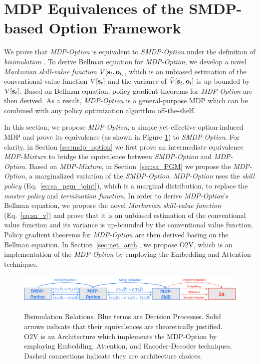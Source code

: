 \documentclass[10pt,journal,compsoc]{IEEEtran}
\newcommand{\red}[1]{\textcolor[HTML]{EB4335}{#1}}
\newcommand{\blue}[1]{\textcolor[HTML]{4285F4}{#1}}
\renewcommand{\cite}{\citep}
\begin{document}
\section{MDP Equivalences of the SMDP-based Option Framework}
\label{sec:smdp_mdp_sa}
We prove that \emph{MDP-Option} is equivalent to
\emph{SMDP-Option} under the definition of \emph{bisimulation}
\cite{givan2003equivalence}. To derive Bellman equation for
\emph{MDP-Option}, we develop a novel \emph{Markovian skill-value
  function} $\bar{V}[{\mathbf{s}}_t,{\mathbf{o}}_t]$, which is an unbiased
estimation of the conventional value function $V[{\mathbf{s}}_t]$ and the
variance of $\bar{V}[{\mathbf{s}}_t,{\mathbf{o}}_t]$ is up-bounded by
$V[{\mathbf{s}}_t]$. Based on Bellman equation, policy gradient theorems
for \emph{MDP-Option} are then derived. As a result,
\emph{MDP-Option} is a general-purpose MDP which can be combined
with any policy optimization algorithm off-the-shelf.


In this section, we propose \emph{MDP-Option}, a simple yet
effective option-induced MDP and prove its equivalence (as shown
in Figure \ref{fig:sa_logic}) to \emph{SMDP-Option}. For clarity,
in Section \ref{sec:mdp_option} we first prove an intermediate
equivalence \emph{MDP-Mixture} to bridge the equivalence between
\emph{SMDP-Option} and \emph{MDP-Option}. Based on
\emph{MDP-Mixture}, in Section~\ref{sec:sa_PGM} we propose the
\emph{MDP-Option}, a marginalized variation of the \emph{SMDP-Option}. \emph{MDP-Option}
uses the \emph{skill policy} (Eq.~\ref{eq:sa_pgm_joint}), which
is a marginal distribution, to replace the \emph{master policy}
and \emph{termination function}. In order to derive \emph{MDP-Option}'s
Bellman equation, we propose the novel \emph{Markovian
  skill-value function} (Eq.~\ref{eq:sa_v}) and prove that it is
an unbiased estimation of the conventional value function and its
variance is up-bounded by the conventional value function. Policy
gradient theorems for \emph{MDP-Option} are then derived basing on the
Bellman equation. In Section~\ref{sec:net_arch}, we propose O2V,
which is an implementation of the \emph{MDP-Option} by employing the
Embedding and Attention \cite{vaswani2017attention} techniques.
\begin{figure}[h!]
 \centering
  \includegraphics[width=1\linewidth]{figures/SA_Logics.png}\\
  \caption{\label{fig:sa_logic} \red{Bisimulation Relations}.
    \blue{Blue} terms are \blue{Decision Processes}. Solid arrows
    indicate that their equivalences are theoretically justified.
    \red{O2V} is an \red{Architecture} which implements the
    \blue{MDP-Option} by employing Embedding, Attention, and
    Encoder-Decoder techniques. Dashed connections indicate they
    are architecture choices.}
\end{figure}
\end{document}
